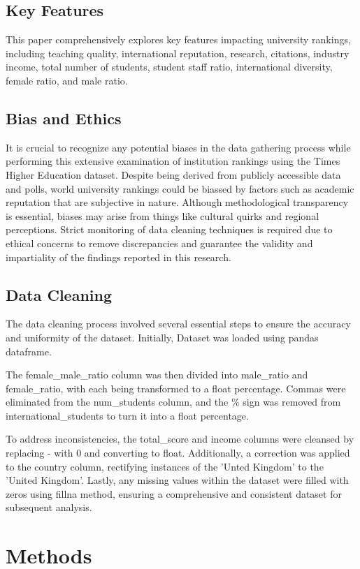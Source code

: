 \documentclass[a4paper]{article}
\begin{document}
\subsection* {Key Features}
This paper comprehensively explores key features impacting university rankings, including teaching quality, international reputation, research, citations, industry income, total number of students, student staff ratio, international diversity, female ratio, and male ratio.
\subsection* {Bias and Ethics}
It is crucial to recognize any potential biases in the data gathering process while performing this extensive examination of institution rankings using the Times Higher Education dataset. Despite being derived from publicly accessible data and polls, world university rankings could be biassed by factors such as academic reputation that are subjective in nature. Although methodological transparency is essential, biases may arise from things like cultural quirks and regional perceptions. Strict monitoring of data cleaning techniques is required due to ethical concerns to remove discrepancies and guarantee the validity and impartiality of the findings reported in this research.
\subsection* {Data Cleaning} 
The data cleaning process involved several essential steps to ensure the accuracy and uniformity of the dataset. Initially, Dataset was loaded using pandas dataframe. 

The female\_male\_ratio column was then divided into male\_ratio and female\_ratio, with each being transformed to a float percentage. Commas were eliminated from the num\_students column, and the \% sign was removed from international\_students to turn it into a float percentage.

To address inconsistencies, the total\_score and income columns were cleansed by replacing - with 0 and converting to float. Additionally, a correction was applied to the country column, rectifying instances of the 'Unted Kingdom' to the 'United Kingdom'. Lastly, any missing values within the dataset were filled with zeros using fillna method, ensuring a comprehensive and consistent dataset for subsequent analysis.

\section*{Methods}
\end{document}
